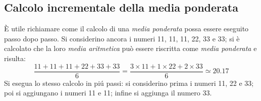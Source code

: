 \documentclass[12pt,a4paper]{article}
\begin{document}

\subsection{Calcolo incrementale della media ponderata}


È utile richiamare  come il calcolo di  una \emph{media ponderata} possa essere  eseguito passo dopo
passo.  Si considerino ancora i numeri  \num{11}, \num{11}, \num{11}, \num{22}, \num{33} e \num{33};
si è calcolato che la loro \emph{media  aritmetica} può essere riscritta come \emph{media ponderata}
e risulta:
\begin{equation*}
  \frac{\num{11} + \num{11} + \num{11} + \num{22} + \num{33} + \num{33}}{6}
  = \frac{\num{3} \times{} \num{11}
     + \num{1} \times{} \num{22}
     + \num{2} \times{} \num{33}}
  {6} \simeq \num{20,17}
\end{equation*}
Si  esegua lo  stesso calcolo  in piú  passi: si  considerino prima  i numeri  \num{11}, \num{22}  e
\num{33}; poi si aggiungano i numeri \num{11} e \num{11}; infine si aggiunga il numero \num{33}.
\end{document}
